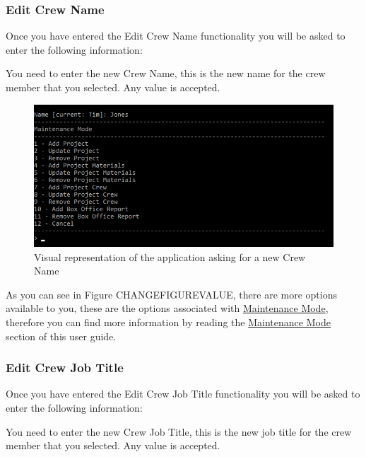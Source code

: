 \documentclass[
  english,
  a4paper,
,tablecaptionabove
]{scrartcl}
\begin{document}
\hypertarget{edit-crew-name-2}{%
\subsubsection{Edit Crew Name}\label{edit-crew-name-2}}

Once you have entered the Edit Crew Name functionality you will be asked
to enter the following information:

You need to enter the new Crew Name, this is the new name for the crew
member that you selected. Any value is accepted.

\begin{figure}
\centering
\includegraphics{images/user-guide/maintenance-mode/update-crew-name.png}
\caption{Visual representation of the application asking for a new Crew
Name}
\end{figure}

As you can see in Figure CHANGEFIGUREVALUE, there are more options
available to you, these are the options associated with
\protect\hyperlink{using-maintenance-mode}{Maintenance Mode}, therefore
you can find more information by reading the
\protect\hyperlink{using-maintenance-mode}{Maintenance Mode} section of
this user guide.

\newpage

\hypertarget{edit-crew-job-title-2}{%
\subsubsection{Edit Crew Job Title}\label{edit-crew-job-title-2}}

Once you have entered the Edit Crew Job Title functionality you will be
asked to enter the following information:

You need to enter the new Crew Job Title, this is the new job title for
the crew member that you selected. Any value is accepted.
\end{document}
